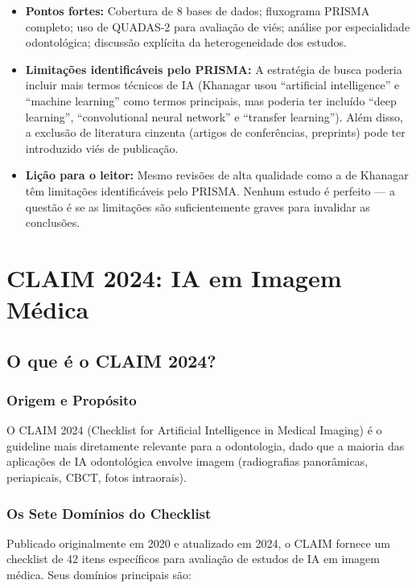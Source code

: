 \begin{itemize}
    \item \textbf{Pontos fortes:} Cobertura de 8 bases de dados; fluxograma PRISMA completo; uso de QUADAS-2 para avaliação de viés; análise por especialidade odontológica; discussão explícita da heterogeneidade dos estudos.
    \item \textbf{Limitações identificáveis pelo PRISMA:} A estratégia de busca poderia incluir mais termos técnicos de IA (Khanagar usou ``artificial intelligence'' e ``machine learning'' como termos principais, mas poderia ter incluído ``deep learning'', ``convolutional neural network'' e ``transfer learning''). Além disso, a exclusão de literatura cinzenta (artigos de conferências, preprints) pode ter introduzido viés de publicação.
    \item \textbf{Lição para o leitor:} Mesmo revisões de alta qualidade como a de Khanagar têm limitações identificáveis pelo PRISMA. Nenhum estudo é perfeito — a questão é se as limitações são suficientemente graves para invalidar as conclusões.
\end{itemize}

\section{CLAIM 2024: IA em Imagem Médica}

\subsection{O que é o CLAIM 2024?}

\subsubsection{Origem e Propósito}

O CLAIM 2024 (Checklist for Artificial Intelligence in Medical Imaging)  é o guideline mais diretamente relevante para a odontologia, dado que a maioria das aplicações de IA odontológica envolve imagem (radiografias panorâmicas, periapicais, CBCT, fotos intraorais).

\subsubsection{Os Sete Domínios do Checklist}

Publicado originalmente em 2020 e atualizado em 2024, o CLAIM fornece um checklist de 42 itens específicos para avaliação de estudos de IA em imagem médica. Seus domínios principais são:

